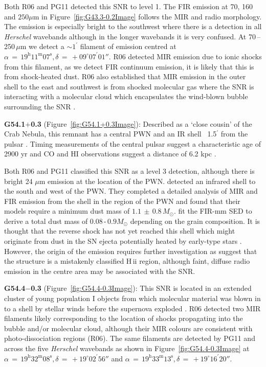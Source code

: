 \documentclass[fleqn,usenatbib]{mnras}
\begin{document}
{Both R06 and PG11 detected this SNR to level 1. The FIR emission at 70, 160 and $250\mu$m in Figure~\ref{fig:G43.3-0.2Image} follows the MIR and radio morphology. The emission is especially bright to the southwest where there is a detection in all \textit{Herschel} wavebands although in the longer wavebands it is very confused. At 70\,--\,250\,$\mu$m we detect a $\sim1^\prime$ filament of emission centred at $\alpha\,=\,19^\text{h}11^\text{m}07^\text{s}, \delta\,=\,+09^\circ07^\prime01''$. R06 detected MIR emission due to ionic shocks from this filament, as we detect FIR continuum emission, it is likely that this is from shock-heated dust. R06 also established that MIR emission in the outer shell to the east and southwest is from shocked molecular gas where the SNR is interacting with a molecular cloud which encapsulates the wind-blown bubble surrounding the SNR \citep{Keohane2007}.
\bigskip

\textbf{G54.1$+$0.3} (Figure~\ref{fig:G54.1+0.3Image}): Described as a `close cousin' of the Crab Nebula, this remnant has a central PWN and an IR shell ~1.5$^\prime$ from the pulsar \citep{Koo2008}. Timing measurements of the central pulsar suggest a characteristic age of 2900 yr \citep{Camilo2002} and CO and HI observations suggest a distance of 6.2 kpc \citep{Leahy2008}.

Both R06 and PG11 classified this SNR as a level 3 detection, although there is bright 24 $\mu$m emission at the location of the PWN. \citet{Temim2017} detected an infrared shell to the south and west of the PWN. They completed a detailed analysis of MIR and FIR emission from the shell in the region of the PWN and found that their models require a minimum dust mass of $1.1\,\pm\,0.8\,M_\odot$.  \cite{Rho2018} fit the FIR-mm SED to derive a total dust mass of $0.08\,$-$\,0.9 M_{\odot}$ depending on the grain composition.  It is thought that the reverse shock has not yet reached this shell which might originate from dust in the SN ejecta potentially heated by early-type stars \citep{Temim2010}. However, the origin of the emission requires further investigation as \citet{Anderson2017} suggest that the structure is a mistakenly classified H\,{\sc ii} region, although faint, diffuse radio emission in the centre area may be associated with the SNR.
\bigskip

\textbf{G54.4$-$0.3} (Figure~\ref{fig:G54.4-0.3Image}): This SNR is located in an extended cluster of young population I objects from which molecular material was blown in to a shell by stellar winds before the supernova exploded \citep{Junkes1992}. R06 detected two MIR filaments likely corresponding to the location of shocks propagating into the bubble and/or molecular cloud, although their MIR colours are consistent with photo-dissociation regions (R06). The same filaments are detected by PG11 and across the five \textit{Herschel} wavebands as shown in Figure~\ref{fig:G54.4-0.3Image} at $\alpha\,=\,19^\text{h}32^\text{m}08^\text{s}, \delta\,=\,+19^\circ02^\prime56''$ and $\alpha\,=\,19^\text{h}33^\text{m}13^\text{s}, \delta\,=\,+19^\circ16^\prime20''$.
\bigskip

}
\end{document}
